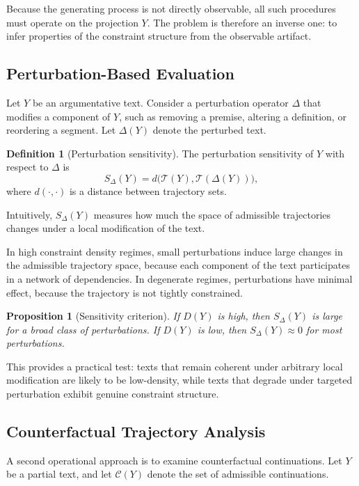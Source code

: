 \documentclass[12pt, oneside]{article}
\theoremstyle{plain}
\newtheorem{proposition}[theorem]{Proposition}
\theoremstyle{definition}
\newtheorem{definition}[theorem]{Definition}
\theoremstyle{remark}
\begin{document}
Because the generating process is not directly observable, all such procedures must
operate on the projection $Y$. The problem is therefore an inverse one: to infer
properties of the constraint structure from the observable artifact.

\subsection{Perturbation-Based Evaluation}

Let $Y$ be an argumentative text. Consider a perturbation operator $\Delta$ that
modifies a component of $Y$, such as removing a premise, altering a definition,
or reordering a segment. Let $\Delta(Y)$ denote the perturbed text.

\begin{definition}[Perturbation sensitivity]
The perturbation sensitivity of $Y$ with respect to $\Delta$ is
\[
  S_\Delta(Y) = d\bigl( \mathcal{T}(Y), \mathcal{T}(\Delta(Y)) \bigr),
\]
where $d(\cdot,\cdot)$ is a distance between trajectory sets.
\end{definition}

Intuitively, $S_\Delta(Y)$ measures how much the space of admissible trajectories
changes under a local modification of the text.

In high constraint density regimes, small perturbations induce large changes in the
admissible trajectory space, because each component of the text participates in a
network of dependencies. In degenerate regimes, perturbations have minimal effect,
because the trajectory is not tightly constrained.

\begin{proposition}[Sensitivity criterion]
If $D(Y)$ is high, then $S_\Delta(Y)$ is large for a broad class of perturbations.
If $D(Y)$ is low, then $S_\Delta(Y) \approx 0$ for most perturbations.
\end{proposition}

This provides a practical test: texts that remain coherent under arbitrary local
modification are likely to be low-density, while texts that degrade under targeted
perturbation exhibit genuine constraint structure.

\subsection{Counterfactual Trajectory Analysis}

A second operational approach is to examine counterfactual continuations. Let $Y$
be a partial text, and let $\mathcal{C}(Y)$ denote the set of admissible continuations.
\end{document}
